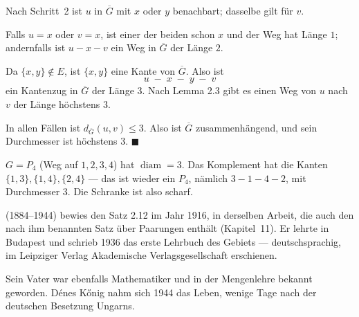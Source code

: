 \begin{aufgabe}
Nach Schritt~2 ist $u$ in $\overline{G}$ mit $x$ oder $y$ benachbart; dasselbe gilt für $v$.

 Falls $u = x$ oder $v = x$, ist einer der beiden schon $x$ und der Weg hat Länge $1$; andernfalls ist $u\!-\!x\!-\!v$ ein Weg in $\overline{G}$ der Länge $2$.

 Da $\{x,y\} \notin E$, ist $\{x,y\}$ eine Kante von $\overline{G}$. Also ist
\[ u \;-\; x \;-\; y \;-\; v \]
ein Kantenzug in $\overline{G}$ der Länge $3$. Nach Lemma 2.3 gibt es einen Weg von $u$ nach $v$ der Länge höchstens $3$.

In allen Fällen ist $d_{\overline{G}}(u,v) \le 3$. Also ist $\overline{G}$ zusammenhängend, und sein Durchmesser ist höchstens $3$. $\blacksquare$

$G = P_4$ (Weg auf $1,2,3,4$) hat $\operatorname{diam} = 3$. Das Komplement hat die Kanten $\{1,3\}, \{1,4\}, \{2,4\}$ --- das ist wieder ein $P_4$, nämlich $3\!-\!1\!-\!4\!-\!2$, mit Durchmesser $3$. Die Schranke ist also scharf. \checkmark
\end{aufgabe}

\begin{geschichte}
 (1884--1944) bewies den Satz 2.12 im Jahr 1916, in derselben Arbeit, die auch den nach ihm benannten Satz über Paarungen enthält (Kapitel~11). Er lehrte in Budapest und schrieb 1936 das erste Lehrbuch des Gebiets --- deutschsprachig, im Leipziger Verlag Akademische Verlagsgesellschaft erschienen.

Sein Vater  war ebenfalls Mathematiker und in der Mengenlehre bekannt geworden. Dénes Kőnig nahm sich 1944 das Leben, wenige Tage nach der deutschen Besetzung Ungarns.

\begin{center}
\begin{minipage}{0.9\textwidth}
\end{minipage}
\end{center}
\end{geschichte}

